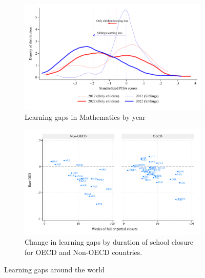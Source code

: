 


\begin{figure}[htbp]
    \centering
    
    \begin{subfigure}{\textwidth}
        \centering
        \includegraphics[width=\textwidth]{./FIGURES/Descriptive/PISA_distribution_2012_2022_PV4MATH.pdf}
        \caption{Learning gaps in Mathematics by year}
        \label{fig:1a}
    \end{subfigure}
    
    \vspace{1em} %
    
    \begin{subfigure}{\textwidth}
        \centering
        \includegraphics[width=\textwidth]{./FIGURES/Descriptive/PISA_raw_DID_PV4MATH_not_fully_open.pdf}
        \caption{Change in learning gaps by duration of school closure for OECD and Non-OECD countries.}
        \label{fig:1b}
    \end{subfigure}
    
    \caption{Learning gaps around the world}
    \label{fig:pisa}
\end{figure}




